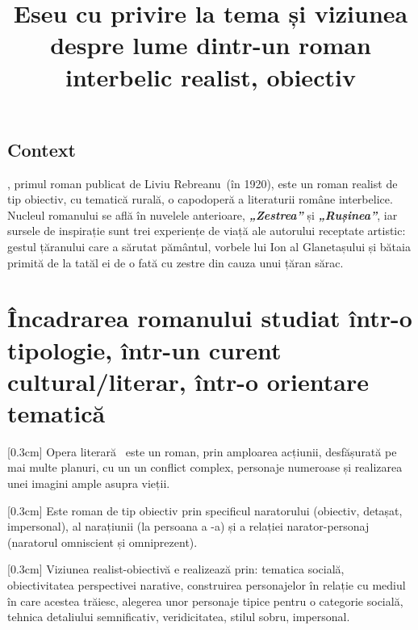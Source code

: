 

\newcommand{\operatitle}{\textbfit{„Ion”}} %
\newcommand{\operaauthor}{Liviu Rebreanu} %

\title{Eseu cu privire la tema și viziunea despre lume dintr-un roman interbelic realist, obiectiv}



\maketitle %



\subsection{Context}

\operatitle, primul roman publicat de \operaauthor\ (în 1920), este un roman realist de tip obiectiv, cu tematică rurală, o capodoperă a literaturii române interbelice. Nucleul romanului se află în nuvelele anterioare, \textbf{\textit{„Zestrea”}} și \textbf{\textit{„Rușinea”}}, iar sursele de inspirație sunt trei experiențe de viață ale autorului receptate artistic: gestul țăranului care a sărutat pământul, vorbele lui Ion al Glanetașului și bătaia primită de la tatăl ei de o fată cu zestre din cauza unui țăran sărac.


\section{Încadrarea romanului studiat într-o tipologie, într-un curent cultural/literar, într-o orientare tematică}

[0.3cm]
Opera literară \operatitle\ este un roman, prin amploarea acțiunii, desfășurată pe mai multe planuri, cu un un conflict complex, personaje numeroase și realizarea unei imagini ample asupra vieții.

[0.3cm]
Este roman de tip obiectiv prin specificul naratorului (obiectiv, detașat, impersonal), al narațiunii (la persoana a -a) și a relației narator-personaj (naratorul omniscient și omniprezent).

[0.3cm]
Viziunea realist-obiectivă e realizează prin: tematica socială, obiectivitatea perspectivei narative, construirea personajelor în relație cu mediul în care acestea trăiesc, alegerea unor personaje tipice pentru o categorie socială, tehnica detaliului semnificativ, veridicitatea, stilul sobru, impersonal.


